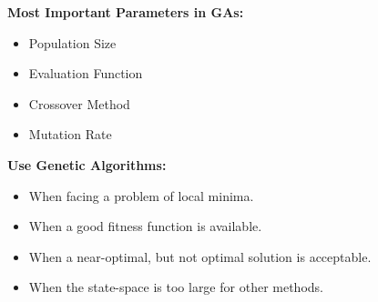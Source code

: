 \textbf{Most Important Parameters in GAs:}
\begin{itemize}
	\item Population Size
	\item Evaluation Function
	\item Crossover Method
	\item Mutation Rate
\end{itemize}

\textbf{Use Genetic Algorithms:} 
\begin{itemize}
	\item When facing a problem of local minima.
	\item When a good fitness function is available.
	\item When a near-optimal, but not optimal solution is acceptable.
	\item When the state-space is too large for other methods.
\end{itemize}

